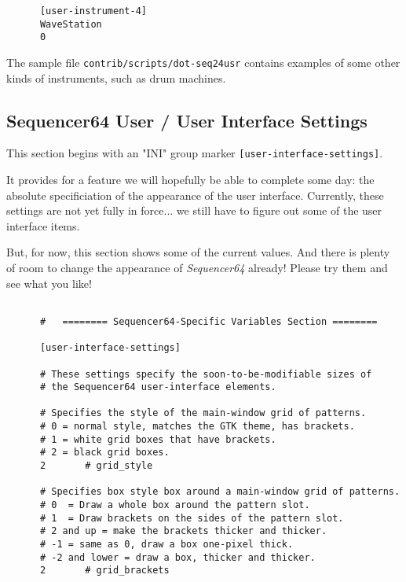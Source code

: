    \begin{verbatim}
      [user-instrument-4]
      WaveStation
      0
   \end{verbatim}

   The sample file \texttt{contrib/scripts/dot-seq24usr} contains examples
   of some other kinds of instruments, such as drum machines.

\subsection{Sequencer64 User / User Interface Settings}
\label{subsec:seq64_usr_file_user_interface_settings}

   This section begins with an
   "INI" group marker \texttt{[user-interface-settings]}.

   It provides for a feature we will hopefully be able to complete some day:
   the absolute specificiation of the appearance of the user interface.
   Currently, these settings are not yet fully in force... we still have to
   figure out some of the user interface items.

   But, for now, this section shows some of the current values.
   And there is plenty of room to change the appearance of
   \textsl{Sequencer64} already!  Please try them and see what you like!

   \begin{verbatim}

      #   ======== Sequencer64-Specific Variables Section ========

      [user-interface-settings]

      # These settings specify the soon-to-be-modifiable sizes of
      # the Sequencer64 user-interface elements.

      # Specifies the style of the main-window grid of patterns.
      # 0 = normal style, matches the GTK theme, has brackets.
      # 1 = white grid boxes that have brackets.
      # 2 = black grid boxes.
      2       # grid_style

      # Specifies box style box around a main-window grid of patterns.
      # 0  = Draw a whole box around the pattern slot.
      # 1  = Draw brackets on the sides of the pattern slot.
      # 2 and up = make the brackets thicker and thicker.
      # -1 = same as 0, draw a box one-pixel thick.
      # -2 and lower = draw a box, thicker and thicker.
      2       # grid_brackets
   \end{verbatim}

